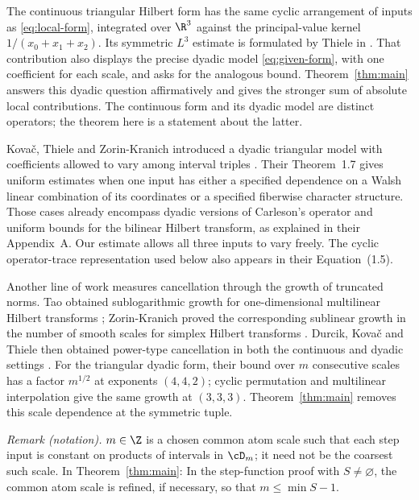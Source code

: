 The continuous triangular Hilbert form has the same cyclic arrangement
of inputs as \eqref{eq:local-form}, integrated over \(\R^3\) against the
principal-value kernel \(1/(x_0+x_1+x_2)\). Its symmetric \(L^3\) estimate is formulated by
Thiele in \cite[Section~9, Problem~13]{ThieleProblem2017}. That
contribution also displays the precise dyadic model
\eqref{eq:given-form}, with one coefficient for each scale, and asks
for the analogous bound. Theorem~\ref{thm:main} answers this dyadic
question affirmatively and gives the stronger sum of absolute local
contributions. The continuous form and its dyadic model are distinct
operators; the theorem here is a statement about the latter.

Kova\v{c}, Thiele and Zorin-Kranich introduced a dyadic triangular
model with coefficients allowed to vary among interval triples
\cite[Equations~(1.5)--(1.6)]{KTZ2015}. Their Theorem~1.7 gives
uniform estimates when one input has either a specified dependence
on a Walsh linear combination of its coordinates or a specified
fiberwise character structure. Those cases already encompass dyadic
versions of Carleson's operator and uniform bounds for the bilinear
Hilbert transform, as explained in their Appendix~A. Our estimate
allows all three inputs to vary freely. The cyclic operator-trace
representation used below also appears in their Equation~(1.5).

Another line of work measures cancellation through the growth of
truncated norms. Tao obtained sublogarithmic growth for
one-dimensional multilinear Hilbert transforms
\cite[Theorem~1.2]{Tao2016}; Zorin-Kranich proved the corresponding
sublinear growth in the number of smooth scales for simplex Hilbert
transforms \cite[Theorem~1.3]{ZK2017}. Durcik, Kova\v{c} and Thiele
then obtained power-type cancellation in both the continuous and
dyadic settings \cite[Theorems~1 and~4]{DKT2019}. For the triangular
dyadic form, their bound over \(m\) consecutive scales has a factor
\(m^{1/2}\) at exponents \((4,4,2)\); cyclic permutation and multilinear
interpolation give the same growth at \((3,3,3)\). Theorem~\ref{thm:main}
removes this scale dependence at the symmetric tuple.

\noindent\textit{Remark (notation).} $m\in\Z$ is a chosen common atom scale such that each step input is constant on products of intervals in $\cD_m$; it need not be the coarsest such scale. In Theorem~\ref{thm:main}: In the step-function proof with $S\ne\varnothing$, the common atom scale is refined, if necessary, so that $m\le\min S-1$.



